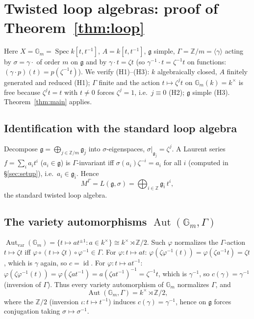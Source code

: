 \documentclass{amsart}
\theoremstyle{definition}
\DeclareMathOperator{\Aut}{Aut}
\DeclareMathOperator{\Spec}{Spec}
\DeclareMathOperator{\id}{id}
\newcommand{\Gm}{\mathbb{G}_m}
\newcommand{\g}{\mathfrak{g}}
\newcommand{\Z}{\mathbb{Z}}
\newcommand{\M}{M}
\begin{document}
\section{Twisted loop algebras: proof of Theorem~\ref{thm:loop}}
\label{sec:loop}

Here $X=\Gm=\Spec k[t,t^{-1}]$, $A=k[t,t^{-1}]$, $\g$ simple,
$\Gamma=\Z/m=\langle\gamma\rangle$ acting by $\sigma=\gamma\cdot$ of order
$m$ on $\g$ and by $\gamma\cdot t=\zeta t$ (so $\gamma^{-1}\cdot t=
\zeta^{-1}t$ on functions: $(\gamma\cdot p)(t)=p(\zeta^{-1}t)$).  We verify
(H1)--(H3): $k$ algebraically closed, $A$ finitely generated and reduced
(H1); $\Gamma$ finite and the action $t\mapsto\zeta^{j}t$ on
$\Gm(k)=k^\times$ is free because $\zeta^j t=t$ with $t\ne0$ forces
$\zeta^j=1$, i.e.\ $j\equiv0$ (H2); $\g$ simple (H3).  Theorem~\ref{thm:main}
applies.

\subsection{Identification with the standard loop algebra}
Decompose $\g=\bigoplus_{j\in\Z/m}\g_{\bar j}$ into $\sigma$-eigenspaces,
$\sigma|_{\g_{\bar j}}=\zeta^{j}$.  A Laurent series $f=\sum_i a_i t^i$
($a_i\in\g$) is $\Gamma$-invariant iff
$\sigma(a_i)\zeta^{-i}=a_i$ for all $i$ (computed in
\S\ref{sec:setup}), i.e.\ $a_i\in\g_{\bar i}$.  Hence
\[
\M^\Gamma=L(\g,\sigma)=\bigoplus_{i\in\Z}\g_{\bar i}\,t^{i},
\]
the standard twisted loop algebra.

\subsection{The variety automorphisms $\Aut(\Gm,\Gamma)$}
$\Aut_{\mathrm{var}}(\Gm)=\{t\mapsto at^{\pm1}:a\in k^\times\}\cong
k^\times\rtimes\Z/2$.  Such $\varphi$ normalizes the $\Gamma$-action
$t\mapsto\zeta t$ iff $\varphi\circ(t\mapsto\zeta t)\circ\varphi^{-1}\in
\Gamma$.  For $\varphi\colon t\mapsto at$: $\varphi(\zeta\varphi^{-1}(t))
=\varphi(\zeta a^{-1}t)=\zeta t$, which is $\gamma$ again, so $c=\id$.  For
$\varphi\colon t\mapsto at^{-1}$:
$\varphi(\zeta\varphi^{-1}(t))=\varphi(\zeta a t^{-1})
=a(\zeta a t^{-1})^{-1}=\zeta^{-1}t$, which is $\gamma^{-1}$, so
$c(\gamma)=\gamma^{-1}$ (inversion of $\Gamma$).  Thus every variety
automorphism of $\Gm$ normalizes $\Gamma$, and
\[
\Aut(\Gm,\Gamma)=k^\times\rtimes\Z/2,
\]
where the $\Z/2$ (inversion $\iota\colon t\mapsto t^{-1}$) induces
$c(\gamma)=\gamma^{-1}$, hence on $\g$ forces conjugation taking
$\sigma\mapsto\sigma^{-1}$.
\end{document}
